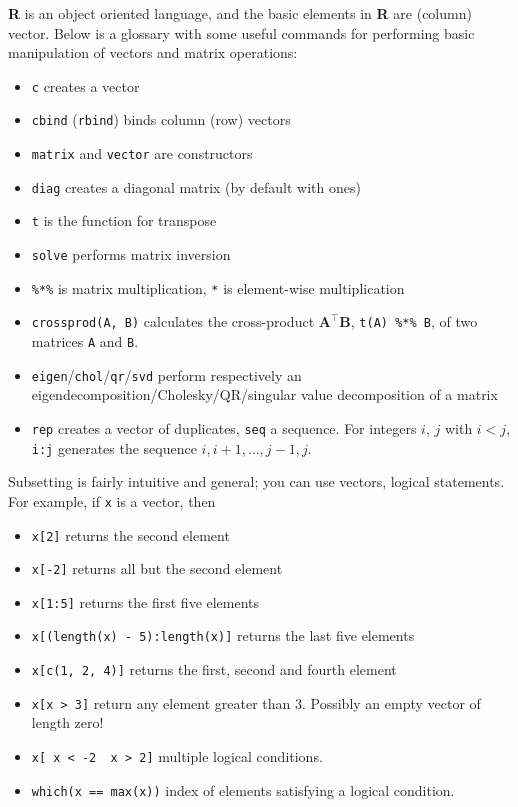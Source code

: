 \documentclass[]{book}
\providecommand{\tightlist}{%
  \setlength{\itemsep}{0pt}\setlength{\parskip}{0pt}}
\theoremstyle{definition}
\theoremstyle{definition}
\theoremstyle{definition}
\theoremstyle{remark}
\begin{document}
\textbf{R} is an object oriented language, and the basic elements in
\textbf{R} are (column) vector. Below is a glossary with some useful
commands for performing basic manipulation of vectors and matrix
operations:

\begin{itemize}
\tightlist
\item
  \texttt{c} creates a vector
\item
  \texttt{cbind} (\texttt{rbind}) binds column (row) vectors
\item
  \texttt{matrix} and \texttt{vector} are constructors
\item
  \texttt{diag} creates a diagonal matrix (by default with ones)
\item
  \texttt{t} is the function for transpose
\item
  \texttt{solve} performs matrix inversion
\item
  \texttt{\%*\%} is matrix multiplication, \texttt{*} is element-wise
  multiplication
\item
  \texttt{crossprod(A,\ B)} calculates the cross-product
  \(\mathbf{A}^\top\mathbf{B}\), \texttt{t(A)\ \%*\%\ B}, of two
  matrices \texttt{A} and \texttt{B}.
\item
  \texttt{eigen}/\texttt{chol}/\texttt{qr}/\texttt{svd} perform
  respectively an eigendecomposition/Cholesky/QR/singular value
  decomposition of a matrix
\item
  \texttt{rep} creates a vector of duplicates, \texttt{seq} a sequence.
  For integers \(i\), \(j\) with \(i<j\), \texttt{i:j} generates the
  sequence \(i, i+1, \ldots, j-1, j\).
\end{itemize}

Subsetting is fairly intuitive and general; you can use vectors, logical
statements. For example, if \texttt{x} is a vector, then

\begin{itemize}
\tightlist
\item
  \texttt{x{[}2{]}} returns the second element
\item
  \texttt{x{[}-2{]}} returns all but the second element
\item
  \texttt{x{[}1:5{]}} returns the first five elements
\item
  \texttt{x{[}(length(x)\ -\ 5):length(x){]}} returns the last five
  elements
\item
  \texttt{x{[}c(1,\ 2,\ 4){]}} returns the first, second and fourth
  element
\item
  \texttt{x{[}x\ \textgreater{}\ 3{]}} return any element greater than
  3. Possibly an empty vector of length zero!
\item
  \texttt{x{[}\ x\ \textless{}\ -2\ \textbar{}\ x\ \textgreater{}\ 2{]}}
  multiple logical conditions.
\item
  \texttt{which(x\ ==\ max(x))} index of elements satisfying a logical
  condition.
\end{itemize}
\end{document}
